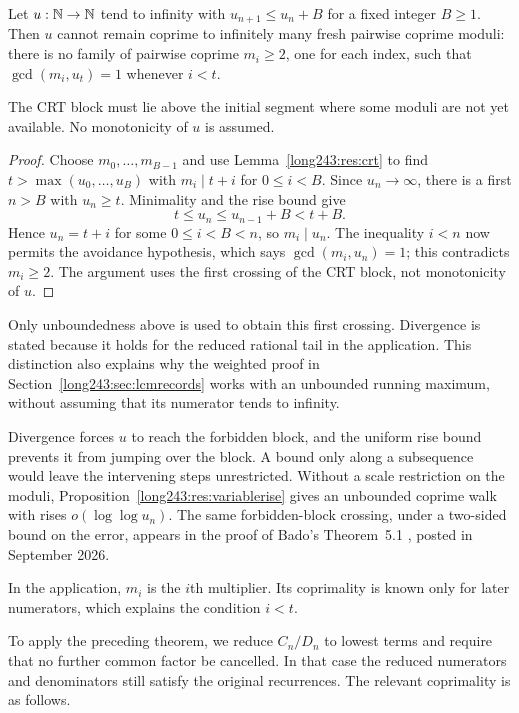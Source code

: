 \documentclass[11pt]{article}
\begin{document}
\begin{theorem}\label{long243:res:barrier}
Let $u:\mathbb{N}\to\mathbb{N}$ tend to infinity with $u_{n+1}\le u_n+B$ for a fixed integer $B\ge1$.
Then $u$ cannot remain coprime to infinitely many fresh pairwise coprime
moduli: there is no family of pairwise coprime $m_i\ge2$, one for each index,
such that $\gcd(m_i,u_t)=1$ whenever $i<t$.
\end{theorem}

The CRT block must lie above the initial segment where some moduli
are not yet available. No monotonicity of $u$ is assumed.

\begin{proof}
Choose $m_0,\ldots,m_{B-1}$ and use Lemma~\ref{long243:res:crt} to find
$t>\max(u_0,\ldots,u_B)$ with $m_i\mid t+i$ for $0\le i<B$.  Since
$u_n\to\infty$, there is a first $n>B$ with $u_n\ge t$.  Minimality and the
rise bound give
\[
 t\le u_n\le u_{n-1}+B<t+B.
\]
Hence $u_n=t+i$ for some $0\le i<B<n$, so $m_i\mid u_n$.  The inequality
$i<n$ now permits the avoidance hypothesis, which says
$\gcd(m_i,u_n)=1$; this contradicts $m_i\ge2$.  The argument uses the first
crossing of the CRT block, not monotonicity of $u$.
\end{proof}

Only unboundedness above is used to obtain this first crossing.
Divergence is stated because it holds for the reduced rational tail in
the application. This distinction also explains why the weighted proof
in Section~\ref{long243:sec:lcmrecords} works with an unbounded running
maximum, without assuming that its numerator tends to infinity.


Divergence forces $u$ to reach the forbidden block, and the uniform rise
bound prevents it from jumping over the block. A bound only along a
subsequence would leave the intervening steps unrestricted. Without a scale restriction on the moduli,
Proposition~\ref{long243:res:variablerise} gives an unbounded coprime walk
with rises $o(\log\log u_n)$.  The same forbidden-block crossing,
under a two-sided bound on the error, appears in the proof of Bado's
Theorem~5.1 \cite[pp.~4--5]{bado2026}, posted in September 2026.

In the application, $m_i$ is the $i$th multiplier. Its coprimality is
known only for later numerators, which explains the condition $i<t$.

To apply the preceding theorem, we reduce $C_n/D_n$ to lowest terms
and require that no further common factor be cancelled. In that case
the reduced numerators and denominators still satisfy the original
recurrences. The relevant coprimality is as follows.
\end{document}
